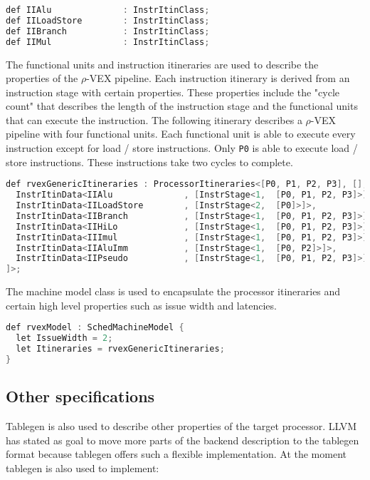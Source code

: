 \begin{lstlisting}[language=java] 
def IIAlu              : InstrItinClass;
def IILoadStore        : InstrItinClass;
def IIBranch           : InstrItinClass;
def IIMul              : InstrItinClass;
\end{lstlisting}

The functional units and instruction itineraries are used to describe the properties of the $\rho$-VEX pipeline. Each instruction itinerary is derived from an instruction stage with certain properties. These properties include the "cycle count" that describes the length of the instruction stage and the functional units that can execute the instruction. The following itinerary describes a $\rho$-VEX pipeline with four functional units. Each functional unit is able to execute every instruction except for load / store instructions. Only \texttt{P0} is able to execute load / store instructions. These instructions take two cycles to complete.

\begin{lstlisting}[language=java] 
def rvexGenericItineraries : ProcessorItineraries<[P0, P1, P2, P3], [], [
  InstrItinData<IIAlu              , [InstrStage<1,  [P0, P1, P2, P3]>]>,
  InstrItinData<IILoadStore        , [InstrStage<2,  [P0]>]>,
  InstrItinData<IIBranch           , [InstrStage<1,  [P0, P1, P2, P3]>]>,
  InstrItinData<IIHiLo             , [InstrStage<1,  [P0, P1, P2, P3]>]>,
  InstrItinData<IIImul             , [InstrStage<1,  [P0, P1, P2, P3]>]>,
  InstrItinData<IIAluImm           , [InstrStage<1,  [P0, P2]>]>,
  InstrItinData<IIPseudo           , [InstrStage<1,  [P0, P1, P2, P3]>]>
]>;
\end{lstlisting}

The machine model class is used to encapsulate the processor itineraries and certain high level properties such as issue width and latencies.

\begin{lstlisting}[language=java] 
def rvexModel : SchedMachineModel {
  let IssueWidth = 2;
  let Itineraries = rvexGenericItineraries;
}
\end{lstlisting}

\subsection{Other specifications}
Tablegen is also used to describe other properties of the target processor. LLVM has stated as goal to move more parts of the backend description to the tablegen format because tablegen offers such a flexible implementation. At the moment tablegen is also used to implement:

